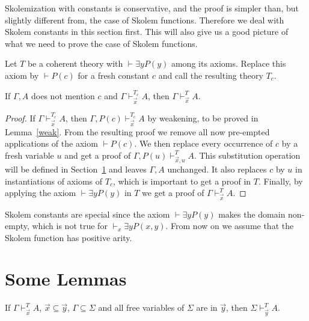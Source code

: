 \documentclass[10pt,a4paper]{article}
\begin{document}
Skolemization with constants is conservative, and the proof is simpler than,
but slightly different from, the case of Skolem functions.
Therefore we deal with Skolem constants in this section first.
This will also give us a good picture of what we need to prove
the case of Skolem functions.

Let $T$ be a coherent theory with $\vdash\exists y P(y)$ among its axioms.
Replace this axiom by $\vdash P(c)$ for a fresh constant $c$
and call the resulting theory $T_c$. 

\begin{theorem}
If $\Gamma,A$ does not mention $c$ and $\Gamma\vdash_{\vec{x}}^{T_c} A$, then
$\Gamma\vdash_{\vec{x}}^{T} A$.
\end{theorem}

\begin{proof}
If $\Gamma\vdash_{\vec{x}}^{T_c} A$, then $\Gamma,P(c)\vdash_{\vec{x}}^{T_c} A$
by weakening, to be proved in Lemma~\ref{weak}.
From the resulting proof we remove all now pre-empted applications of
the axiom $\vdash P(c)$. We then
replace every occurrence of $c$ by a fresh variable $u$ and 
get a proof of $\Gamma,P(u)\vdash_{\vec{x},u}^{T} A$.
This substitution operation will be defined in Section~\ref{auxlemmas}
and leaves $\Gamma,A$ unchanged.
It also replaces $c$ by $u$ in instantiations of axioms of $T_c$,
which is important to get a proof in $T$. Finally,
by applying the axiom $\vdash\exists y P(y)$ in $T$ 
we get a proof of $\Gamma\vdash_{\vec{x}}^{T} A$.
\end{proof}

Skolem constants are special since the axiom $\vdash\exists y P(y)$
makes the domain non-empty, which is not true for $\vdash_x\exists y P(x,y)$.
From now on we assume that the Skolem function has positive arity.

\section{Some Lemmas}\label{auxlemmas}


\begin{lemma}\label{weak}
If $\Gamma\vdash_{\vec{x}}^T A$, $\vec{x}\subseteq \vec{y}$, $\Gamma\subseteq \Sigma$ and all free variables of $\Sigma$ are in $\vec{y}$, then $\Sigma\vdash_{\vec{y}}^T A$.
\end{lemma}
\end{document}

